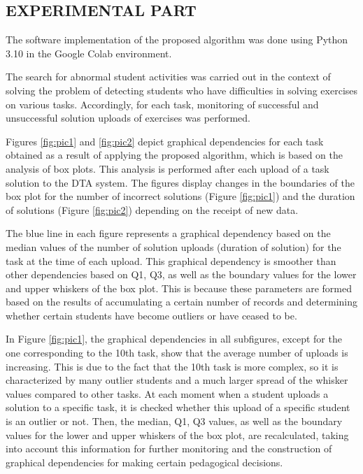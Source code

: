 \documentclass{article}
\begin{document}
  \begin{multicols}{2}
    \begin{justify}
      \section{EXPERIMENTAL PART}
      The software implementation of the proposed algorithm was done using Python 3.10 in the Google Colab environment.

      The search for abnormal student activities was carried out in the context of solving the problem of detecting students who have difficulties in solving exercises on various tasks. Accordingly, for each task, monitoring of successful and unsuccessful solution uploads of exercises was performed.

      Figures \ref{fig:pic1} and \ref{fig:pic2} depict graphical dependencies for each task obtained as a result of applying the proposed algorithm, which is based on the analysis of box plots. This analysis is performed after each upload of a task solution to the DTA system. The figures display changes in the boundaries of the box plot for the number of incorrect solutions (Figure \ref{fig:pic1}) and the duration of solutions (Figure \ref{fig:pic2}) depending on the receipt of new data.

      The blue line in each figure represents a graphical dependency based on the median values of the number of solution uploads (duration of solution) for the task at the time of each upload. This graphical dependency is smoother than other dependencies based on Q1, Q3, as well as the boundary values for the lower and upper whiskers of the box plot. This is because these parameters are formed based on the results of accumulating a certain number of records and determining whether certain students have become outliers or have ceased to be.

      In Figure \ref{fig:pic1}, the graphical dependencies in all subfigures, except for the one corresponding to the 10th task, show that the average number of uploads is increasing. This is due to the fact that the 10th task is more complex, so it is characterized by many outlier students and a much larger spread of the whisker values compared to other tasks. At each moment when a student uploads a solution to a specific task, it is checked whether this upload of a specific student is an outlier or not. Then, the median, Q1, Q3 values, as well as the boundary values for the lower and upper whiskers of the box plot, are recalculated, taking into account this information for further monitoring and the construction of graphical dependencies for making certain pedagogical decisions.


\end{justify}
\end{multicols}
\end{document}
